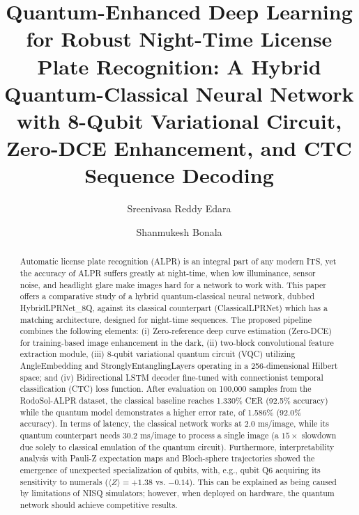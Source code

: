 \documentclass[preprint,12pt]{elsarticle}
\begin{document}
\begin{frontmatter}

\title{Quantum-Enhanced Deep Learning for Robust Night-Time License Plate Recognition: A Hybrid Quantum-Classical Neural Network with 8-Qubit Variational Circuit, Zero-DCE Enhancement, and CTC Sequence Decoding}

\author[1]{Sreenivasa Reddy Edara}

\author[1]{Shanmukesh Bonala}



\begin{abstract}
Automatic license plate recognition (ALPR) is an integral part of any modern ITS, yet the accuracy of ALPR suffers greatly at night-time, when low illuminance, sensor noise, and headlight glare make images hard for a network to work with. This paper offers a comparative study of a hybrid quantum-classical neural network, dubbed HybridLPRNet\_8Q, against its classical counterpart (ClassicalLPRNet) which has a matching architecture, designed for night-time sequences. The proposed pipeline combines the following elements: (i) Zero-reference deep curve estimation (Zero-DCE) for training-based image enhancement in the dark, (ii) two-block convolutional feature extraction module, (iii) 8-qubit variational quantum circuit (VQC) utilizing AngleEmbedding and StronglyEntanglingLayers operating in a 256-dimensional Hilbert space; and (iv) Bidirectional LSTM decoder fine-tuned with connectionist temporal classification (CTC) loss function. After evaluation on 100,000 samples from the RodoSol-ALPR dataset, the classical baseline reaches 1.330\% CER (92.5\% accuracy) while the quantum model demonstrates a higher error rate, of 1.586\% (92.0\% accuracy). In terms of latency, the classical network works at 2.0 ms/image, while its quantum counterpart needs 30.2 ms/image to process a single image (a $15\times$ slowdown due solely to classical emulation of the quantum circuit). Furthermore, interpretability analysis with Pauli-Z expectation maps and Bloch-sphere trajectories showed the emergence of unexpected specialization of qubits, with, e.g., qubit Q6 acquiring its sensitivity to numerals ($\langle Z \rangle = +1.38$ vs. $-0.14$). This can be explained as being caused by limitations of NISQ simulators; however, when deployed on hardware, the quantum network should achieve competitive results.
\end{abstract}


\end{frontmatter}
\end{document}
